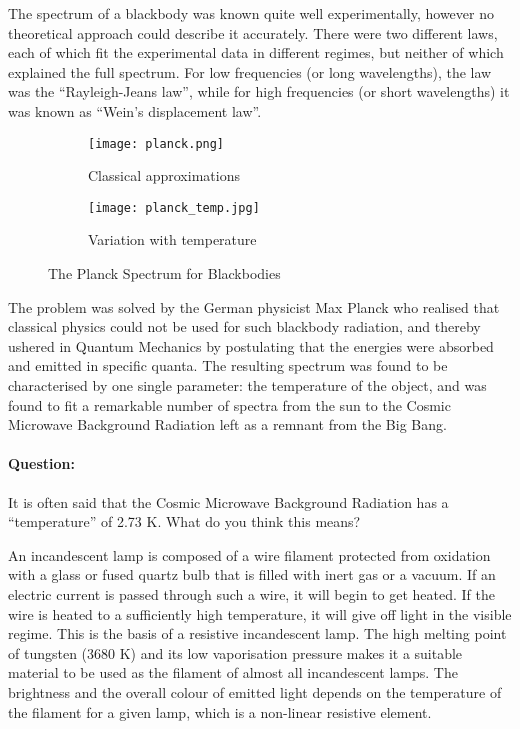

The spectrum of a blackbody was known quite well experimentally, however no theoretical approach could describe it accurately. There were two different laws, each of which fit the experimental data in different regimes, but neither of which explained the full spectrum. For low frequencies (or long wavelengths), the law was the ``Rayleigh-Jeans law'', while for high frequencies (or short wavelengths) it was known as ``Wein's displacement law''.

\begin{figure}[!htb]
\centering
\begin{subfigure}[b]{0.45\textwidth}
        \texttt{[image: planck.png]}
        \caption{Classical approximations}
        \label{planck_approx}
    \end{subfigure}%
    \begin{subfigure}[b]{0.45\textwidth}
        \hspace{0.5cm}\texttt{[image: planck\_temp.jpg]}
        \caption{Variation with temperature}
        \label{planck_temp}
    \end{subfigure}
\caption{The Planck Spectrum for Blackbodies}
\label{planck}
\end{figure}

The problem was solved by the German physicist Max Planck who realised that classical physics could not be used for such blackbody radiation, and thereby ushered in Quantum Mechanics by postulating that the energies were absorbed and emitted in specific quanta. The resulting spectrum was found to be characterised by one single parameter: the temperature of the object, and was found to fit a remarkable number of spectra from the sun to the Cosmic Microwave Background Radiation left as a remnant from the Big Bang.

\begin{question}
\paragraph{Question: } It is often said that the Cosmic Microwave Background Radiation has a ``temperature'' of 2.73 K. What do you think this means?
\end{question}


An incandescent lamp is composed of a wire filament protected from oxidation with a glass or fused quartz bulb that is filled with inert gas or a vacuum. If an electric current is passed through such a wire, it will begin to get heated. If the wire is heated to a sufficiently high temperature, it will give off light in the visible regime.  This is the basis of a resistive incandescent lamp. The high melting point of tungsten (3680 K) and its low vaporisation pressure makes it a suitable material to be used as the filament of almost all incandescent lamps. The brightness and the overall colour of emitted light depends on the temperature of the filament for a given lamp, which is a non-linear resistive element.


